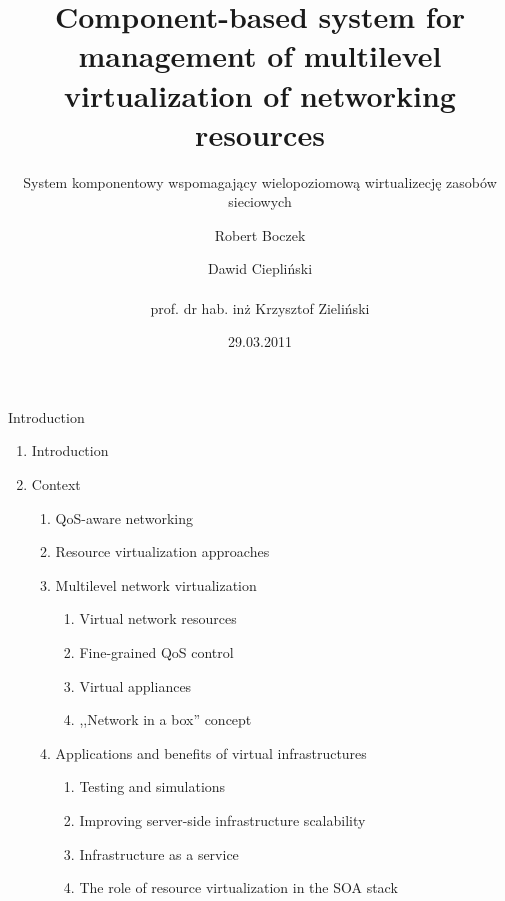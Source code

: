 \documentclass{beamer}
\title{Component-based system for management of multilevel virtualization of networking resources}
\subtitle{System komponentowy wspomagający wielopoziomową wirtualizecję zasobów sieciowych}
\author{Robert Boczek \and Dawid Ciepliński \\ ~ \\ prof. dr hab. inż Krzysztof Zieliński}
\date{29.03.2011}
\begin{document}
\begin{frame}

	\titlepage

\end{frame}


\begin{frame}{Introduction}

	\begin{enumerate}

		\item Introduction \pause

		\item Context

			\begin{enumerate}
			
				\item QoS-aware networking \pause
				\item Resource virtualization approaches \pause
				\item Multilevel network virtualization
					
					\begin{enumerate}
						\item Virtual network resources
						\item Fine-grained QoS control
						\item Virtual appliances
						\item ,,Network in a box'' concept
					\end{enumerate}

					\pause

				\item Applications and benefits of virtual infrastructures

					\begin{enumerate}
						\item Testing and simulations
						\item Improving server-side infrastructure scalability
						\item Infrastructure as a service
						\item The role of resource virtualization in the SOA stack
					\end{enumerate}
			
			\end{enumerate}
	
	\end{enumerate}

\end{frame}
\end{document}

